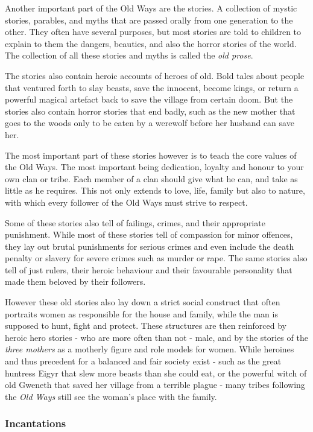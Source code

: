 Another important part of the Old Ways are the stories. A collection of mystic
stories, parables, and myths that are passed orally from one generation to the
other. They often have several purposes, but most stories are told to children
to explain to them the dangers, beauties, and also the horror stories of the
world. The collection of all these stories and myths is called the
\emph{old prose}.

The stories also contain heroic accounts of heroes of old. Bold tales about
people that ventured forth to slay beasts, save the innocent, become kings, or
return a powerful magical artefact back to save the village from certain doom.
But the stories also contain horror stories that end badly, such as the new
mother that goes to the woods only to be eaten by a werewolf before her
husband can save her.

The most important part of these stories however is to teach the core values of
the Old Ways. The most important being dedication, loyalty and honour to your
own clan or tribe. Each member of a clan should give what he can, and take as
little as he requires. This not only extends to love, life, family but also
to nature, with which every follower of the Old Ways must strive to respect.

Some of these stories also tell of failings, crimes, and their appropriate
punishment. While most of these stories tell of compassion for minor offences,
they lay out brutal punishments for serious crimes and even include the death
penalty or slavery for severe crimes such as murder or rape. The same stories
also tell of just rulers, their heroic behaviour and their favourable
personality that made them beloved by their followers.

However these old stories also lay down a strict social construct that often
portraits women as responsible for the house and family, while the man is
supposed to hunt, fight and protect. These structures are then reinforced by
heroic hero stories - who are more often than not - male, and by the stories
of the \emph{three mothers} as a motherly figure and role models for women.
While heroines and thus precedent for a balanced and fair society exist - such
as the great huntress Eigyr that slew more beasts than she could eat, or the
powerful witch of old Gweneth that saved her village from a terrible plague -
many tribes following the \emph{Old Ways} still see the woman's place with
the family.

\subsubsection*{Incantations}

